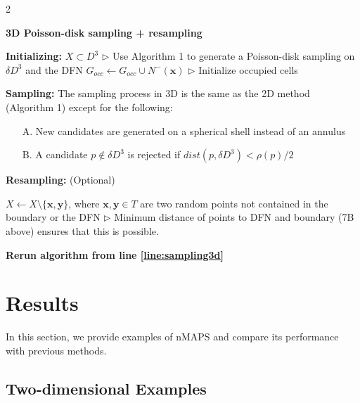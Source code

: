 \documentclass[preprint, 10pt]{elsarticle}
\newcommand{\vx}{{\mathbf x}}
\newcommand{\vy}{{\mathbf y}}
\theoremstyle{definition}
\theoremstyle{remark}
\begin{document}
\begin{algorithm}[H]	
	\caption{2}{\textbf{3D Poisson-disk sampling + resampling}\label{alg:3d}}

	\begin{algorithmic}[1]
		\STATE \textbf{Initializing:}
		\STATE $X\subset D^3$ \hfill $\triangleright$ Use Algorithm 1 to generate a Poisson-disk sampling on $\delta D^3$ and the DFN \label{line:seed3d} \label{line:init3d}
		\FOR{$\vx\in X$}
		\STATE $G_{occ}\leftarrow G_{occ}\cup N^-(\vx)$ \hfill $\triangleright$ Initialize occupied cells \label{line:hfhf}
		\ENDFOR 
	
		
		\STATE	 \textbf{Sampling:} \label{line:sampling3d}
		\STATE The sampling process in 3D is the same as the 2D method (Algorithm 1) except for the following: 
		\begin{itemize}
			\item[A.] New candidates are generated on a spherical shell instead of an annulus
			\item[B.] A candidate $p\notin \delta D^3$ is rejected if $dist(p,\delta D^3)<\rho(p)/2$
		\end{itemize}
		\STATE \textbf{Resampling:}  (Optional)
		
		\REPEAT 
		 \label{line:triangulate}
		 \label{line:sliver}
		\STATE $X\leftarrow X\setminus\{\vx,\vy\}$, where $\vx,\vy\in T$ are two random points not contained in the boundary or the DFN \label{line:rem_nodes}
		 \hfill $\triangleright$ Minimum distance of points to DFN and boundary (7B above) ensures that this is possible.
		\ENDIF
		\ENDFOR

		\STATE \textbf{Rerun algorithm from line \ref{line:sampling3d}}\label{line:rerun3d}
		\label{line:term3d}
		
	\end{algorithmic}
	
	
\end{algorithm} 



\section{Results}\label{sec:results}

In this section, we provide examples of nMAPS and compare its performance with previous methods.

\subsection{Two-dimensional Examples}
\end{document}
